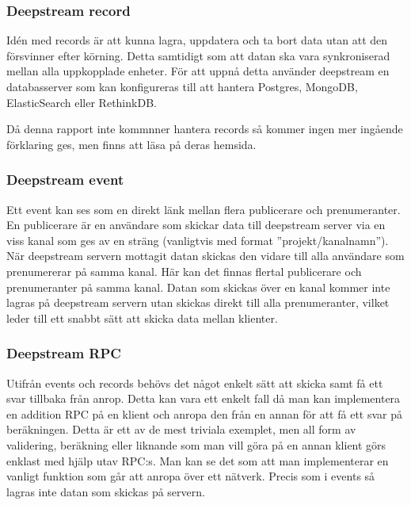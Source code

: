 \subsubsection{Deepstream record}
\label{subsec:tim-ds-record}
Idén med records är att kunna lagra, uppdatera och ta bort data utan att den försvinner efter körning.\cite{ds:record} Detta samtidigt som att datan ska vara synkroniserad mellan alla uppkopplade enheter. För att uppnå detta använder deepstream en databasserver som kan konfigureras till att hantera Postgres, MongoDB, ElasticSearch eller RethinkDB. 

Då denna rapport inte kommnner hantera records så kommer ingen mer ingående förklaring ges, men finns att läsa på deras hemsida.\cite{ds-storingdata}

\subsubsection{Deepstream event}
\label{subsec:tim-ds-event}
Ett event kan ses som en direkt länk mellan flera publicerare och prenumeranter.\cite{ds:event} En publicerare är en användare som skickar data till deepstream server via en viss kanal som ges av en sträng (vanligtvis med format ''projekt/kanalnamn''). När deepstream servern mottagit datan skickas den vidare till alla användare som prenumererar på samma kanal. Här kan det finnas flertal publicerare och prenumeranter på samma kanal. Datan som skickas över en kanal kommer inte lagras på deepstream servern utan skickas direkt till alla prenumeranter, vilket leder till ett snabbt sätt att skicka data mellan klienter.

\subsubsection{Deepstream RPC}
\label{subsec:tim-ds-rpc}
Utifrån events och records behövs det något enkelt sätt att skicka samt få ett svar tillbaka från anrop. Detta kan vara ett enkelt fall då man kan implementera en addition RPC på en klient och anropa den från en annan för att få ett svar på beräkningen.\cite{ds:rpc} Detta är ett av de mest triviala exemplet, men all form av validering, beräkning eller liknande som man vill göra på en annan klient görs enklast med hjälp utav RPC:s. Man kan se det som att man implementerar en vanligt funktion som går att anropa över ett nätverk. Precis som i events så lagras inte datan som skickas på servern.

